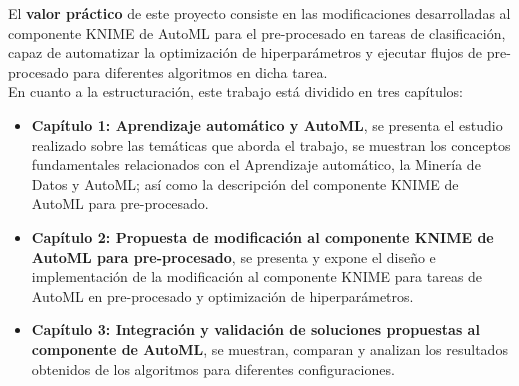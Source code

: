 El \textbf{valor práctico} de este proyecto consiste en las modificaciones desarrolladas al componente KNIME de AutoML para el pre-procesado en tareas de clasificación, capaz de automatizar la optimización de hiperparámetros y ejecutar flujos de pre-procesado para diferentes algoritmos en dicha tarea. \\
En cuanto a la estructuración, este trabajo está dividido en tres capítulos:
\begin{itemize}
	\item \textbf{Capítulo 1: Aprendizaje automático y AutoML}, se presenta el estudio realizado sobre las temáticas que aborda el trabajo, se muestran los conceptos fundamentales relacionados con el Aprendizaje automático, la Minería de Datos y AutoML; así como la descripción del componente KNIME de AutoML para pre-procesado.
	\item \textbf{Capítulo 2: Propuesta de modificación al componente KNIME de AutoML para pre-procesado}, se presenta y expone el diseño e implementación de la modificación al componente KNIME para tareas de AutoML en pre-procesado y optimización de hiperparámetros.
		\item \textbf{Capítulo 3: Integración y validación de soluciones propuestas al componente de AutoML}, se muestran, comparan y analizan los resultados obtenidos de los algoritmos para diferentes configuraciones.
\end{itemize}







